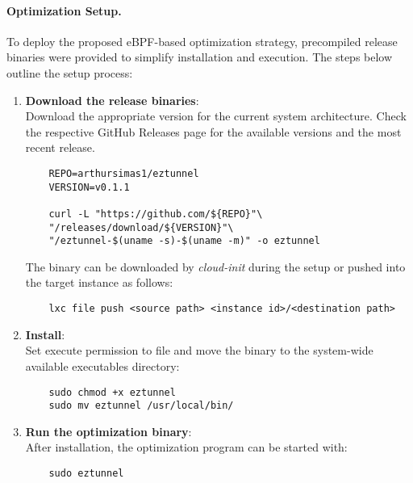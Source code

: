 \paragraph{Optimization Setup.} To deploy the proposed eBPF-based optimization strategy, precompiled release binaries were provided to simplify installation and execution. The steps below outline the setup process:

\begin{enumerate}
    \item \textbf{Download the release binaries}:\\
    Download the appropriate version for the current system architecture. Check the respective GitHub Releases page for the available versions and the most recent release.

    \begin{verbatim}
    REPO=arthursimas1/eztunnel
    VERSION=v0.1.1

    curl -L "https://github.com/${REPO}"\
    "/releases/download/${VERSION}"\
    "/eztunnel-$(uname -s)-$(uname -m)" -o eztunnel
    \end{verbatim}

    The binary can be downloaded by \textit{cloud-init} during the setup or pushed into the target instance as follows:

    \begin{verbatim}
    lxc file push <source path> <instance id>/<destination path>
    \end{verbatim}

    \item \textbf{Install}:\\
    Set execute permission to file and move the binary to the system-wide available executables directory:

    \begin{verbatim}
    sudo chmod +x eztunnel
    sudo mv eztunnel /usr/local/bin/
    \end{verbatim}

    \item \textbf{Run the optimization binary}:\\
    After installation, the optimization program can be started with:
    \begin{verbatim}
    sudo eztunnel
    \end{verbatim}

\end{enumerate}

